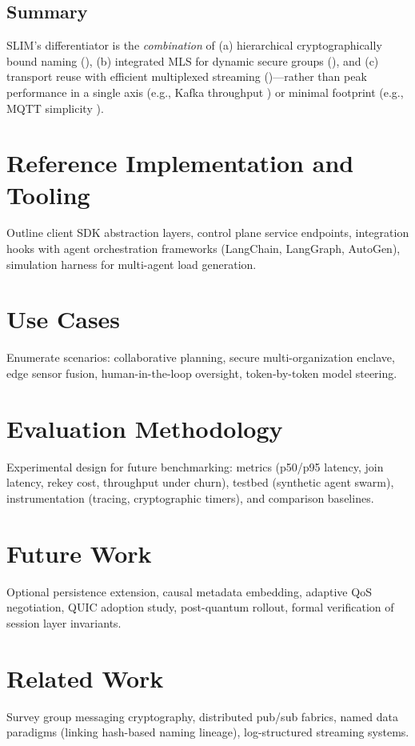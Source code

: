 \documentclass{article}
\theoremstyle{definition}
\theoremstyle{remark}
\begin{document}
\subsection{Summary}
SLIM's differentiator is the \emph{combination} of (a) hierarchical
cryptographically bound naming (\citep{rfc6920,didcore}), (b) integrated MLS
for dynamic secure groups (\citep{rfc9420,rfc9750}), and (c) transport reuse
with efficient multiplexed streaming (\citep{grpc,http2})—rather than peak
performance in a single axis (e.g., Kafka throughput \citep{kafka}) or
minimal footprint (e.g., MQTT simplicity \citep{mqtt311}).

\section{Reference Implementation and Tooling}\label{sec:implementation}
Outline client SDK abstraction layers, control plane service endpoints,
integration hooks with agent orchestration frameworks (LangChain, LangGraph,
AutoGen), simulation harness for multi-agent load generation.

\section{Use Cases}\label{sec:usecases}
Enumerate scenarios: collaborative planning, secure multi-organization
enclave, edge sensor fusion, human-in-the-loop oversight, token-by-token
model steering.

\section{Evaluation Methodology}\label{sec:evaluation}
Experimental design for future benchmarking: metrics (p50/p95 latency, join
latency, rekey cost, throughput under churn), testbed (synthetic agent swarm),
instrumentation (tracing, cryptographic timers), and comparison baselines.

\section{Future Work}\label{sec:future}
Optional persistence extension, causal metadata embedding, adaptive QoS
negotiation, QUIC adoption study, post-quantum rollout, formal verification of
session layer invariants.

\section{Related Work}\label{sec:related}
Survey group messaging cryptography, distributed pub/sub fabrics, named data
paradigms (linking hash-based naming lineage), log-structured streaming
systems.
\end{document}
